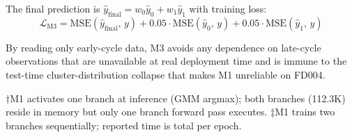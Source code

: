 \documentclass[review,12pt]{elsarticle}
\begin{document}
The final prediction is $\hat{y}_{\text{final}} = w_0\hat{y}_0 + w_1\hat{y}_1$ with training loss:
\begin{equation}
\mathcal{L}_{\text{M3}} = \text{MSE}(\hat{y}_{\text{final}},\, y) + 0.05\cdot\text{MSE}(\hat{y}_0,\, y) + 0.05\cdot\text{MSE}(\hat{y}_1,\, y)
\end{equation}

By reading only early-cycle data, M3 avoids any dependence on late-cycle observations that are unavailable at real deployment time and is immune to the test-time cluster-distribution collapse that makes M1 unreliable on FD004.


\begin{table}[!t]
\centering
\small
\caption{Computational complexity of H3 architectures (FD003, $F$ = 15 features)}
\label{tab:ii}
\end{table}

†M1 activates one branch at inference (GMM argmax); both branches (112.3K) reside in memory but only one branch forward pass executes.  ‡M1 trains two branches sequentially; reported time is total per epoch.
\end{document}
